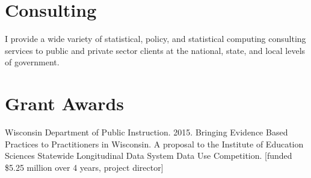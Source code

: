 \documentclass[margin,line]{res}
\begin{document}
\begin{resume}









\section{\sc Consulting}

I provide a wide variety of statistical, policy, and statistical computing 
consulting services to public and private sector clients at the national, state, 
and local levels of government. 

\section{\sc Grant Awards}

Wisconsin Department of Public Instruction. 2015. Bringing Evidence Based 
Practices to Practitioners in Wisconsin. A proposal to the Institute of Education 
Sciences Statewide Longitudinal Data System Data Use Competition.  
[funded \$5.25 million over 4 years, project director]


\end{resume}
\end{document}
